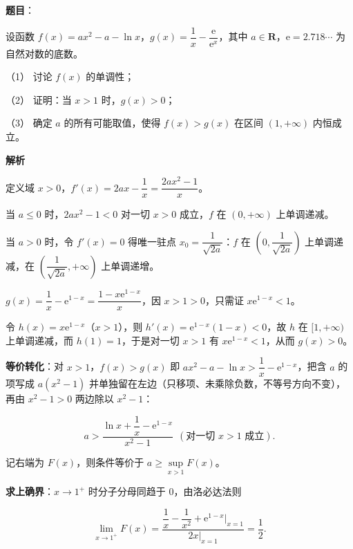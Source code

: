 \begin{answer}

\textbf{题目}：

设函数 \(f(x)=ax^{2}-a-\ln x\)，\(g(x)=\dfrac{1}{x}-\dfrac{\mathrm{e}}{\mathrm{e}^{x}}\)，其中 \(a\in\mathbf{R}\)，\(\mathrm{e}=2.718\cdots\) 为自然对数的底数。

（1） 讨论 \(f(x)\) 的单调性；

（2） 证明：当 \(x>1\) 时，\(g(x)>0\)；

（3） 确定 \(a\) 的所有可能取值，使得 \(f(x)>g(x)\) 在区间 \((1,+\infty)\) 内恒成立。

\textbf{解析}

定义域 \(x>0\)，\(f'(x)=2ax-\dfrac{1}{x}=\dfrac{2ax^{2}-1}{x}\)。


当 \(a\leqslant0\) 时，\(2ax^{2}-1<0\) 对一切 \(x>0\) 成立，\(f\) 在 \((0,+\infty)\) 上单调递减。

当 \(a>0\) 时，令 \(f'(x)=0\) 得唯一驻点 \(x_0=\dfrac{1}{\sqrt{2a}}\)：\(f\) 在 \(\left(0,\dfrac{1}{\sqrt{2a}}\right)\) 上单调递减，在 \(\left(\dfrac{1}{\sqrt{2a}},+\infty\right)\) 上单调递增。


\(g(x)=\dfrac{1}{x}-\mathrm e^{1-x}=\dfrac{1-x\mathrm e^{1-x}}{x}\)，因 \(x>1>0\)，只需证 \(x\mathrm e^{1-x}<1\)。

令 \(h(x)=x\mathrm e^{1-x}\)（\(x>1\)），则 \(h'(x)=\mathrm e^{1-x}(1-x)<0\)，故 \(h\) 在 \([1,+\infty)\) 上单调递减，而 \(h(1)=1\)，于是对一切 \(x>1\) 有 \(x\mathrm e^{1-x}<1\)，从而 \(g(x)>0\)。


\textbf{等价转化}：对 \(x>1\)，\(f(x)>g(x)\) 即 \(ax^{2}-a-\ln x>\dfrac{1}{x}-\mathrm e^{1-x}\)，把含 \(a\) 的项写成 \(a(x^{2}-1)\) 并单独留在左边（只移项、未乘除负数，不等号方向不变），再由 \(x^{2}-1>0\) 两边除以 \(x^{2}-1\)：

\nopagebreak[4]
\[
a>\frac{\ln x+\dfrac{1}{x}-\mathrm e^{1-x}}{x^{2}-1}\ \ (\text{对一切 }x>1\text{ 成立}).
\]

记右端为 \(F(x)\)，则条件等价于 \(a\geqslant\sup\limits_{x>1}F(x)\)。

\textbf{求上确界}：\(x\to1^{+}\) 时分子分母同趋于 \(0\)，由洛必达法则

\nopagebreak[4]
\[
\lim_{x\to1^{+}}F(x)=\frac{\dfrac{1}{x}-\dfrac{1}{x^{2}}+\mathrm e^{1-x}\Big|_{x=1}}{2x\Big|_{x=1}}=\frac{1}{2}.
\]


\end{answer}
